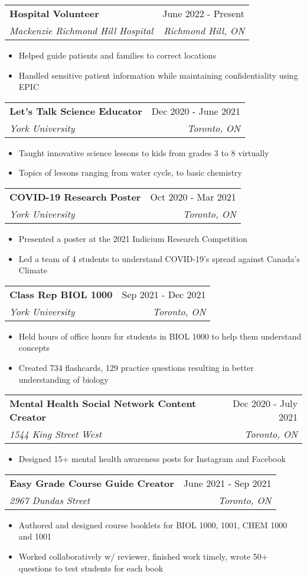 \documentclass[letterpaper,11pt]{article}
\makeatletter
\newcommand{\resumeItem}[1]{
  \item\small{
    {#1 \vspace{-2pt}}
  }
}
\newcommand{\resumeSubheading}[4]{
  \vspace{-2pt}\item
    \begin{tabular*}{0.97\textwidth}[t]{l@{\extracolsep{\fill}}r}
      \textbf{#1} & #2 \\
      \textit{\small#3} & \textit{\small #4} \\
    \end{tabular*}\vspace{-7pt}
}
\newcommand{\resumeItemListStart}{\begin{itemize}}
\newcommand{\resumeItemListEnd}{\end{itemize}\vspace{-5pt}}
\makeatother
\begin{document}
    \resumeSubheading
      {Hospital Volunteer}{June 2022 - Present}
      {Mackenzie Richmond Hill Hospital}{Richmond Hill, ON}
      \resumeItemListStart
        \resumeItem{Helped guide patients and families to correct locations}
        \resumeItem{Handled sensitive patient information while maintaining confidentiality using EPIC}
    \resumeItemListEnd




\hspace{5cm}

\hspace{5cm}
    
    \resumeSubheading
      {Let's Talk Science Educator}{Dec 2020 - June 2021}     
      {York University}{Toronto, ON}
      \resumeItemListStart
        \resumeItem{Taught innovative science lessons to kids from grades 3 to 8 virtually}
        \resumeItem{Topics of lessons ranging from water cycle, to basic chemistry}
    \resumeItemListEnd        
    
    \resumeSubheading
      {COVID-19 Research Poster}{Oct 2020 - Mar 2021}     
      {York University}{Toronto, ON}
      \resumeItemListStart
        \resumeItem{Presented a poster at the  2021 Indicium Research Competition }
        \resumeItem{Led a team of 4 students to understand COVID-19's spread against Canada's Climate}
    \resumeItemListEnd    

    \resumeSubheading
      {Class Rep BIOL 1000}{Sep 2021 - Dec 2021}     
      {York University}{Toronto, ON}
      \resumeItemListStart
        \resumeItem{Held hours of office hours for students in BIOL 1000 to help them understand concepts }
        \resumeItem{Created 734 flashcards, 129 practice questions resulting in better understanding of biology}
    \resumeItemListEnd    
    

    
    \resumeSubheading
      {Mental Health Social Network Content Creator}{Dec 2020 - July 2021}     
      {1544 King Street West}{Toronto, ON}
      \resumeItemListStart
        \resumeItem{Designed 15+ mental health awareness posts for Instagram and Facebook}
    \resumeItemListEnd    


    \resumeSubheading
      {Easy Grade Course Guide Creator}{June 2021 - Sep 2021}
      {2967 Dundas Street}{Toronto, ON}
      \resumeItemListStart
        \resumeItem{Authored and designed course booklets for BIOL 1000, 1001, CHEM 1000 and 1001}
        \resumeItem{Worked collaboratively w/ reviewer, finished work timely, wrote 50+ questions to test students for each book}
    \resumeItemListEnd
        
\end{document}
